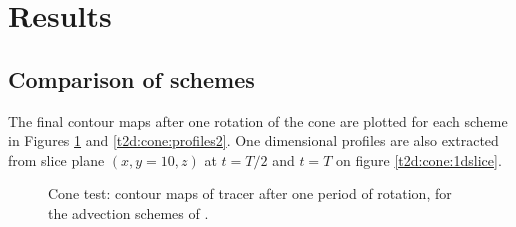 \section{Results}

\subsection{Comparison of schemes}

The final contour maps after one rotation of the cone are plotted for each scheme in Figures \ref{t2d:cone:profiles1} and \ref{t2d:cone:profiles2}. One dimensional profiles are also extracted from
slice plane $(x,y=10,z)$ at $t=T/2$ and $t=T$ on figure \ref{t2d:cone:1dslice}.

\newpage

\begin{figure}[H]
\begin{minipage}[t]{0.50\textwidth}
 \centering
\end{minipage}%
\begin{minipage}[t]{0.50\textwidth}
 \centering
\end{minipage}
\begin{minipage}[t]{0.50\textwidth}
 \centering
\end{minipage}
\begin{minipage}[t]{0.50\textwidth}
 \centering
\end{minipage}
\begin{minipage}[t]{0.50\textwidth}
 \centering
\end{minipage}%
\begin{minipage}[t]{0.50\textwidth}
 \centering
\end{minipage}
\begin{minipage}[t]{0.50\textwidth}
 \centering
\end{minipage}%
\begin{minipage}[t]{0.50\textwidth}
 \centering
\end{minipage}
  \caption{Cone test: contour maps of tracer after one period of rotation, for the advection schemes of .}
 \label{t2d:cone:profiles1}
\end{figure}

